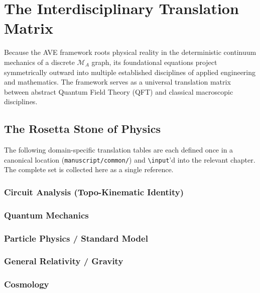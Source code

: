 \appendix

\chapter{The Interdisciplinary Translation Matrix}
\label{app:translation_matrix}

Because the AVE framework roots physical reality in the deterministic continuum mechanics of a discrete $\mathcal{M}_A$ graph, its foundational equations project symmetrically outward into multiple established disciplines of applied engineering and mathematics. The framework serves as a universal translation matrix between abstract Quantum Field Theory (QFT) and classical macroscopic disciplines.

\section{The Rosetta Stone of Physics}

The following domain-specific translation tables are each defined once in a canonical location (\texttt{manuscript/common/}) and \texttt{\textbackslash input}'d into the relevant chapter.  The complete set is collected here as a single reference.

\subsection{Circuit Analysis (Topo-Kinematic Identity)}


\subsection{Quantum Mechanics}


\subsection{Particle Physics / Standard Model}


\subsection{General Relativity / Gravity}


\subsection{Cosmology}


